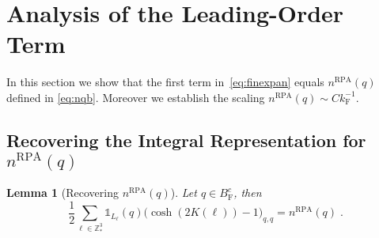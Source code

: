 \documentclass[12pt,a4paper]{article}
\numberwithin{equation}{section}
\newcommand{\1}{\mathbb{I}}
\newcommand{\F}{\mathrm{F}}
\newcommand{\RPA}{\mathrm{RPA}}
\newcommand{\Z}{\mathbb{Z}}
\newcommand{\half}{\frac{1}{2}}
\theoremstyle{plain}
\newtheorem{lemma}[theorem]{Lemma}
\theoremstyle{definition}
\theoremstyle{remark}
\theoremstyle{plain}
\theoremstyle{definition}
\theoremstyle{remark}
\begin{document}
\section{Analysis of the Leading-Order Term}
\label{sec:leading_order_analysis}


In this section we show that the first term in~\eqref{eq:finexpan} equals $ n^{\RPA}(q) $ defined in \eqref{eq:nqb}. Moreover we establish the scaling $ n^{\RPA}(q) \sim C k_{\F}^{-1} $.


\subsection{Recovering the Integral Representation for $ n^{\RPA}(q) $}\label{subsec:integralrep}

\begin{lemma}[Recovering $ n^{\RPA}(q) $] \label{lem:nqb_integralrecovery}
Let $q \in B^c_{\F}$, then
\begin{equation} \label{eq:nqb_integralrecovery}
	\half\sum_{\ell\in \Z^3_*}\mathds{1}_{L_\ell}(q) \big( \cosh(2K(\ell)) - 1 \big)_{q,q} = n^{\RPA}(q)\;.
\end{equation}
\end{lemma}
\end{document}
